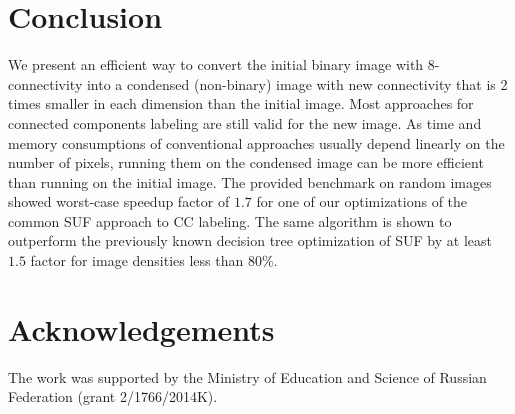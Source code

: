 \documentclass[hidelinks]{llncs}
\begin{document}
\section{Conclusion}

We present an efficient way to convert the initial binary image with
8-connectivity into a condensed (non-binary) image with new connectivity that is
2 times smaller in each dimension than the initial image. Most approaches for
connected components labeling are still valid for the new image. As time and
memory consumptions of conventional approaches usually depend linearly on the
number of pixels, running them on the condensed image can be more efficient than
running on the initial image. The provided benchmark on random images showed
worst-case speedup factor of $1.7$ for one of our optimizations of the common
SUF approach to CC labeling. The same algorithm is shown to outperform the
previously known decision tree optimization of SUF by at least $1.5$ factor for
image densities less than 80\%.

\section{Acknowledgements}

The work was supported by the Ministry of Education and Science of Russian
Federation (grant 2/1766/2014K).
\end{document}
